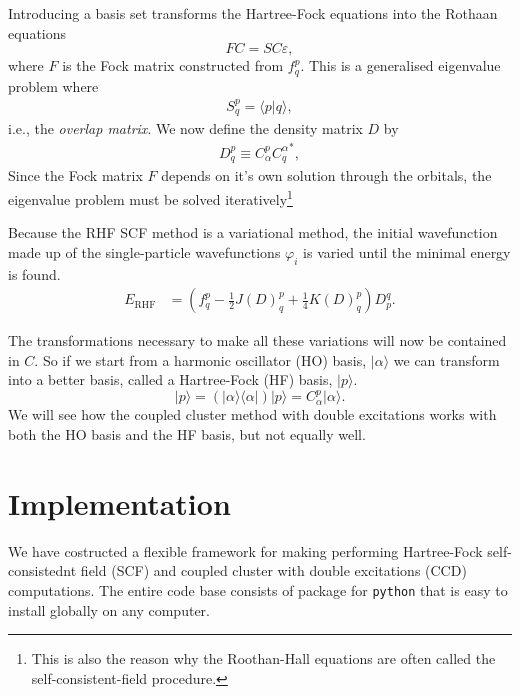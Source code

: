 \documentclass[
    a4paper, aps, twocolumn, floatfix, superscriptaddress,
    nofootinbib]{revtex4-1}
\newcommand{\1}{\mathds{1}}
\newcommand{\para}[1]{\left(#1\right)}
\newcommand{\half}{\frac{1}{2}}
\newcommand{\bra}[1]{\langle #1\lvert}
\newcommand{\ket}[1]{\rvert #1\rangle}
\newcommand{\braket}[2]{\langle #1 \vert #2 \rangle}
\begin{document}
            Introducing a basis set transforms the Hartree-Fock equations into
            the Rothaan equations
            \begin{equation}
                FC = SC\varepsilon,
            \end{equation}
            where $F$ is the Fock matrix constructed from $f^p_q$.  This is a
            generalised eigenvalue problem where
            \begin{align}
                S^{p}_{q} = \braket{p}{q},
            \end{align}
            i.e., the \emph{overlap matrix}. We now define the density matrix
            $D$ by
            \begin{align}
                D^{p}_{q} \equiv C^p_{\alpha}{C^{\alpha}_q}^{*},
            \end{align}
            Since the Fock matrix $F$ depends on it's own solution through the
            orbitals, the eigenvalue problem must be solved
            iteratively\footnote{This is also the reason why the Roothan-Hall
            equations are often called the self-consistent-field procedure.}

            Because the RHF SCF method is a variational method, the initial
            wavefunction made up of the single-particle wavefunctions
            $\varphi_i$ is varied until the minimal energy is found.
            \begin{align}
                E_{\text{RHF}}
                &= \para{
                    f^p_q - \half J(D)^p_q + \frac{1}{4}K(D)^p_q
                }D^q_p.
            \end{align}

            The transformations necessary to make all these variations will now
            be contained in $C$. So if we start from a harmonic oscillator (HO)
            basis, $\ket{\alpha}$ we can transform into a better basis, called a
            Hartree-Fock (HF) basis, $\ket{p}$.
            \begin{equation}
                \ket{p}
                = \para{\ket{\alpha}\bra{\alpha}}\ket{p}
                = C^p_\alpha\ket{\alpha}.
            \end{equation}
            We will see how the coupled cluster method with double excitations
            works with both the HO basis and the HF basis, but not equally well.

\section{Implementation}
    We have costructed a flexible framework for making performing Hartree-Fock
    self-consistednt field (SCF) and coupled cluster with double excitations (CCD)
    computations. The entire code base consists of package for \lstinline{python}
    that is easy to install globally on any computer.
\end{document}
